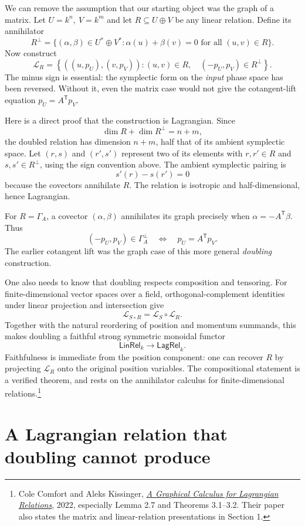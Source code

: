 We can remove the assumption that our starting object was the graph of a matrix. Let
\(U=k^n,\ V=k^m\) and let \(R\subseteq U\oplus V\) be any linear relation. Define its annihilator
\[
 R^\perp=\{(\alpha,\beta)\in U^*\oplus V^*:
          \alpha(u)+\beta(v)=0
          \text{ for all }(u,v)\in R\}.
\]
Now construct
\[
 \boxed{
 \mathcal L_R=
 \left\{((u,p_U),(v,p_V)):
       (u,v)\in R,\quad(-p_U,p_V)\in R^\perp
 \right\}.
 }
\]
The minus sign is essential: the symplectic form on the \emph{input} phase space has been reversed. Without it, even the matrix case would not give the cotangent-lift equation \(p_U=A^{\mathsf T}p_V\).

Here is a direct proof that the construction is Lagrangian. Since
\[
 \dim R+\dim R^\perp=n+m,
\]
the doubled relation has dimension \(n+m\), half that of its ambient symplectic space. Let
\((r,s)\) and \((r',s')\) represent two of its elements with \(r,r'\in R\) and \(s,s'\in R^\perp\), using the sign convention above. The ambient symplectic pairing is
\[
 s'(r)-s(r')=0
\]
because the covectors annihilate \(R\). The relation is isotropic and half-dimensional, hence Lagrangian.

For \(R=\Gamma_A\), a covector \((\alpha,\beta)\) annihilates its graph precisely when
\(\alpha=-A^{\mathsf T}\beta\). Thus
\[
 (-p_U,p_V)\in\Gamma_A^\perp
 \quad\Longleftrightarrow\quad
 p_U=A^{\mathsf T}p_V.
\]
The earlier cotangent lift was the graph case of this more general \emph{doubling} construction.

One also needs to know that doubling respects composition and tensoring. For finite-dimensional vector spaces over a field, orthogonal-complement identities under linear projection and intersection give
\[
 \mathcal L_{S\circ R}=\mathcal L_S\circ\mathcal L_R.
\]
Together with the natural reordering of position and momentum summands, this makes doubling a faithful strong symmetric monoidal functor
\[
 \mathsf{LinRel}_k\longrightarrow\mathsf{LagRel}_k.
\]
Faithfulness is immediate from the position component: one can recover \(R\) by projecting \(\mathcal L_R\) onto the original position variables. The compositional statement is a verified theorem, and rests on the annihilator calculus for finite-dimensional relations.\footnote{Cole Comfort and Aleks Kissinger, \href{https://arxiv.org/abs/2105.06244}{\emph{A Graphical Calculus for Lagrangian Relations}}, 2022, especially Lemma 2.7 and Theorems 3.1--3.2. Their paper also states the matrix and linear-relation presentations in Section 1.}

\section{A Lagrangian relation that doubling cannot produce}


